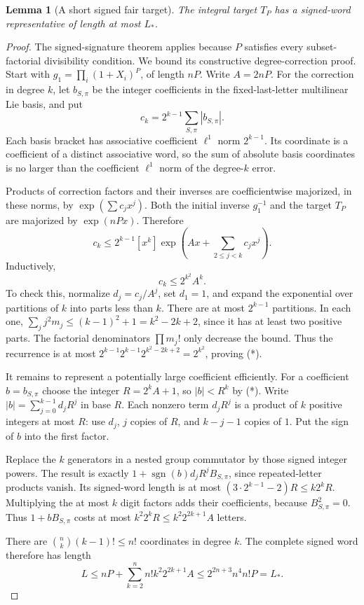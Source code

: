 \documentclass[11pt]{article}
\newtheorem{lemma}[theorem]{Lemma}
\begin{document}
\begin{lemma}[A short signed fair target]\label{signedlength}
The integral target $T_P$ has a signed-word representative of length
at most $L_*$.
\end{lemma}
\begin{proof}
The signed-signature theorem applies because $P$ satisfies every
subset-factorial divisibility condition. We bound its constructive
degree-correction proof. Start with
$g_1=\prod_i(1+X_i)^P$, of length $nP$. Write
$A=2nP$. For the correction in degree $k$, let $b_{S,\pi}$ be the
integer coefficients in the fixed-last-letter multilinear Lie basis,
and put
\[
 c_k=2^{k-1}\sum_{S,\pi}|b_{S,\pi}|.
\]
Each basis bracket has associative coefficient $\ell^1$ norm
$2^{k-1}$. Its coordinate is a coefficient of a distinct associative
word, so the sum of absolute basis coordinates is no larger than the
coefficient $\ell^1$ norm of the degree-$k$ error.

Products of correction factors and their inverses are coefficientwise
majorized, in these norms, by $\exp(\sum c_jx^j)$. Both the initial
inverse $g_1^{-1}$ and the target $T_P$ are majorized by
$\exp(nPx)$. Therefore
\[
 c_k\le2^{k-1}[x^k]
       \exp\left(Ax+\sum_{2\le j<k}c_jx^j\right).
\]
Inductively,
\[
 c_k\le 2^{k^2}A^k.\tag{*}
\]
To check this, normalize $d_j=c_j/A^j$, set $d_1=1$, and expand the
exponential over partitions of $k$ into parts less than $k$. There are
at most $2^{k-1}$ partitions. In each one,
$\sum_j j^2m_j\le(k-1)^2+1=k^2-2k+2$, since it has at least two
positive parts. The factorial denominators $\prod m_j!$ only decrease
the bound. Thus the recurrence is at most
$2^{k-1}2^{k-1}2^{k^2-2k+2}=2^{k^2}$, proving (*).

It remains to represent a potentially large coefficient efficiently.
For a coefficient $b=b_{S,\pi}$ choose the integer
$R=2^kA+1$, so $|b|<R^k$ by (*). Write
$|b|=\sum_{j=0}^{k-1}d_jR^j$ in base $R$.
Each nonzero term $d_jR^j$ is a product of $k$ positive integers at
most $R$: use $d_j$, $j$ copies of $R$, and $k-j-1$ copies of $1$.
Put the sign of $b$ into the first factor.

Replace the $k$ generators in a nested group commutator by those
signed integer powers. The result is exactly
$1+\operatorname{sgn}(b)d_jR^j B_{S,\pi}$, since repeated-letter
products vanish. Its signed-word length is at most
$(3\cdot2^{k-1}-2)R\le k2^kR$.
Multiplying the at most $k$ digit factors adds their coefficients,
because $B_{S,\pi}^2=0$. Thus $1+bB_{S,\pi}$ costs at most
$k^2 2^kR\le k^2 2^{2k+1}A$ letters.

There are $\binom nk(k-1)!\le n!$ coordinates in degree $k$.
The complete signed word therefore has length
\[
 L\le nP+\sum_{k=2}^n n! k^2 2^{2k+1}A
   \le 2^{2n+3}n^4n!P=L_*.
\]
\end{proof}
\end{document}
